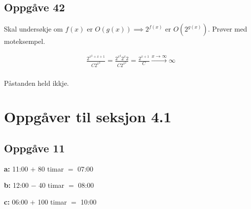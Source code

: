 \documentclass[a4paper, 11pt]{article}
\newcommand{\deloppg}[1]{\vspace{1mm}\noindent \textbf{\themecolor{#1:}}}
\newcommand{\themeshade}{Mahogany}
\newcommand{\themecolor}[1]{\textcolor{\themeshade}{#1}}
\begin{document}
\newpage
\subsection*{Oppgåve 42}
Skal undersøkje om \(f(x) \text{ er } O(g(x)) \implies 2^{f(x)} \text{ er } O(2^{g(x)})\).
Prøver med moteksempel.

\begin{align*}
    & \frac{2^{x^2 + x + 1}}{C2^{x^2}} = \frac{2^{x^2}2^x2}{C2^{x^2}}
        = \frac{2^{x+1}}{C} \xrightarrow{x \rightarrow \infty} \infty \\
\end{align*}

\noindent Påstanden held ikkje.



\section{Oppgåver til seksjon 4.1}

\subsection*{Oppgåve 11}
\deloppg{a} 11:00 $+$ 80 timar $=$ 07:00

\deloppg{b} 12:00 $-$ 40 timar $=$ 08:00

\deloppg{c} 06:00 $+$ 100 timar $=$ 10:00
\end{document}
